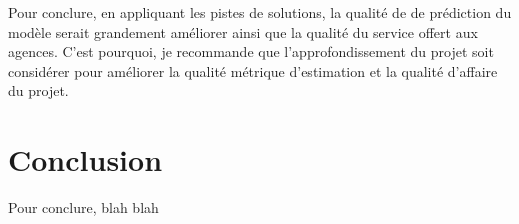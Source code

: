 \documentclass[11pt,french]{report}\usepackage[]{graphicx}\usepackage[]{color}
\begin{document}
Pour conclure, en appliquant les pistes de solutions, la qualité de de prédiction du modèle serait grandement améliorer ainsi que la qualité du service offert aux agences. C'est pourquoi, je recommande que l'approfondissement du projet soit considérer pour améliorer la qualité métrique d'estimation et la qualité d'affaire du projet.

\section*{Conclusion}
Pour conclure, blah blah
\end{document}
